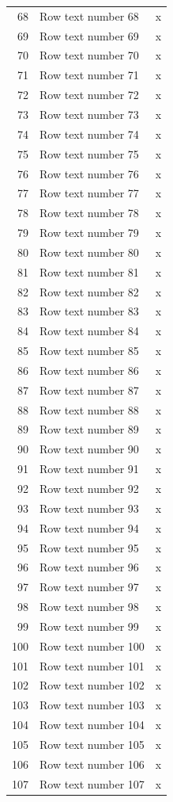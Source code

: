 \documentclass{article}
\begin{document}
\begin{longtable}{|r|p{5cm}|c|}
68&Row text number 68&x\\
69&Row text number 69&x\\
70&Row text number 70&x\\
71&Row text number 71&x\\
72&Row text number 72&x\\
73&Row text number 73&x\\
74&Row text number 74&x\\
75&Row text number 75&x\\
76&Row text number 76&x\\
77&Row text number 77&x\\
78&Row text number 78&x\\
79&Row text number 79&x\\
80&Row text number 80&x\\
81&Row text number 81&x\\
82&Row text number 82&x\\
83&Row text number 83&x\\
84&Row text number 84&x\\
85&Row text number 85&x\\
86&Row text number 86&x\\
87&Row text number 87&x\\
88&Row text number 88&x\\
89&Row text number 89&x\\
90&Row text number 90&x\\
91&Row text number 91&x\\
92&Row text number 92&x\\
93&Row text number 93&x\\
94&Row text number 94&x\\
95&Row text number 95&x\\
96&Row text number 96&x\\
97&Row text number 97&x\\
98&Row text number 98&x\\
99&Row text number 99&x\\
100&Row text number 100&x\\
101&Row text number 101&x\\
102&Row text number 102&x\\
103&Row text number 103&x\\
104&Row text number 104&x\\
105&Row text number 105&x\\
106&Row text number 106&x\\
107&Row text number 107&x\\

\end{longtable}
\end{document}
